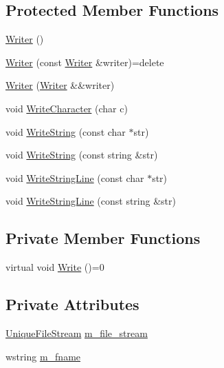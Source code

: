 \subsection*{Protected Member Functions}
\begin{DoxyCompactItemize}
\item 
\hyperlink{classmage_1_1_writer_a40b6cd3005d509e670c5a49272d9ef27}{Writer} ()
\item 
\hyperlink{classmage_1_1_writer_a2b257938508732ca0b78241aafa7922c}{Writer} (const \hyperlink{classmage_1_1_writer}{Writer} \&writer)=delete
\item 
\hyperlink{classmage_1_1_writer_a2581e06e581aed84ee2d3c6a82c7cf58}{Writer} (\hyperlink{classmage_1_1_writer}{Writer} \&\&writer)
\item 
void \hyperlink{classmage_1_1_writer_aa1ef04f5e69c44afda56704c2823316c}{Write\+Character} (char c)
\item 
void \hyperlink{classmage_1_1_writer_abffb25b71fc692db26abfa9dd147874e}{Write\+String} (const char $\ast$str)
\item 
void \hyperlink{classmage_1_1_writer_aaa0e62c04e6ff6c90fa73c64fc48635d}{Write\+String} (const string \&str)
\item 
void \hyperlink{classmage_1_1_writer_ad53f69e0f722c4d4b8b320ea39770c1a}{Write\+String\+Line} (const char $\ast$str)
\item 
void \hyperlink{classmage_1_1_writer_a542963963dc22cdecbdb3a29a3843ee9}{Write\+String\+Line} (const string \&str)
\end{DoxyCompactItemize}
\subsection*{Private Member Functions}
\begin{DoxyCompactItemize}
\item 
virtual void \hyperlink{classmage_1_1_writer_a9baf695ef7f6180bef883f60bcb3ac07}{Write} ()=0
\end{DoxyCompactItemize}
\subsection*{Private Attributes}
\begin{DoxyCompactItemize}
\item 
\hyperlink{namespacemage_a4250d57cb76846bd81137e496ca41148}{Unique\+File\+Stream} \hyperlink{classmage_1_1_writer_ac4884215d1b547e990633474bf61c470}{m\+\_\+file\+\_\+stream}
\item 
wstring \hyperlink{classmage_1_1_writer_afa271ee47897d4961e9d62132d8faeb5}{m\+\_\+fname}
\end{DoxyCompactItemize}


